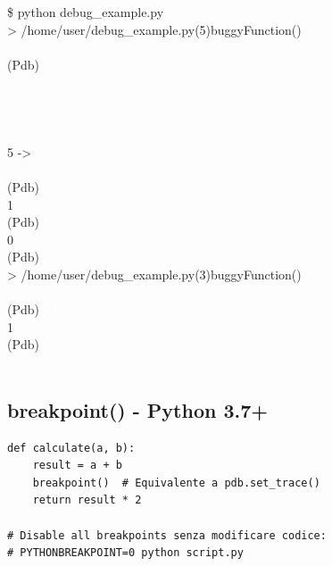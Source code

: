 \begin{tcolorbox}[colback=black!90, coltext=white, fontupper=\ttfamily\footnotesize, title=Terminal: pdb debugging session]
\textcolor{green!80}{\$ python debug\_example.py}\\
\textcolor{cyan!70}{> /home/user/debug\_example.py(5)buggyFunction()}\\
\textcolor{white}{-> total += num}\\
\textcolor{yellow!70}{(Pdb)} \textcolor{white}{l}\\
\textcolor{white}{  1  \quad def buggyFunction(numbers):}\\
\textcolor{white}{  2  \quad     total = 0}\\
\textcolor{white}{  3  \quad     for num in numbers:}\\
\textcolor{white}{  4  \quad         import pdb; pdb.set\_trace()}\\
\textcolor{cyan!70}{  5  ->}\textcolor{white}{         total += num}\\
\textcolor{white}{  6  \quad     return total}\\
\textcolor{yellow!70}{(Pdb)} \textcolor{white}{p num}\\
\textcolor{green!70}{1}\\
\textcolor{yellow!70}{(Pdb)} \textcolor{white}{p total}\\
\textcolor{green!70}{0}\\
\textcolor{yellow!70}{(Pdb)} \textcolor{white}{n}\\
\textcolor{cyan!70}{> /home/user/debug\_example.py(3)buggyFunction()}\\
\textcolor{white}{-> for num in numbers:}\\
\textcolor{yellow!70}{(Pdb)} \textcolor{white}{p total}\\
\textcolor{green!70}{1}\\
\textcolor{yellow!70}{(Pdb)} \textcolor{white}{c}\\
\textcolor{white}{6}
\end{tcolorbox}

\subsection{breakpoint() - Python 3.7+}

\begin{lstlisting}
def calculate(a, b):
    result = a + b
    breakpoint()  # Equivalente a pdb.set_trace()
    return result * 2

# Disable all breakpoints senza modificare codice:
# PYTHONBREAKPOINT=0 python script.py
\end{lstlisting}


